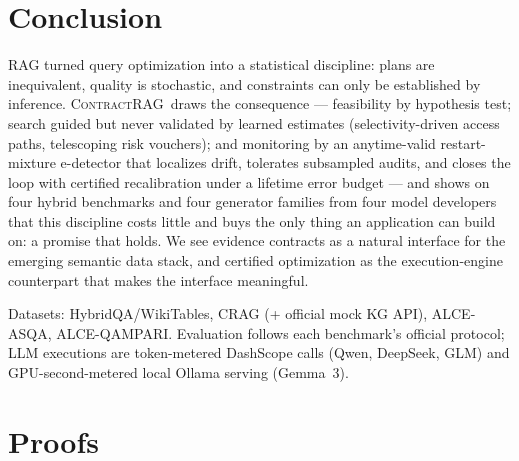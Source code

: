 \documentclass[sigconf,nonacm]{acmart}
\newcommand{\system}{\textsc{ContractRAG}\xspace}
\begin{document}
\maketitle









\section{Conclusion}
\label{sec:conclusion}
RAG turned query optimization into a statistical discipline: plans are
inequivalent, quality is stochastic, and constraints can only be
established by inference. \system\ draws the consequence --- feasibility
by hypothesis test; search guided but never validated by learned
estimates (selectivity-driven access paths, telescoping risk vouchers);
and monitoring by an anytime-valid restart-mixture e-detector that
localizes drift, tolerates subsampled audits, and closes the loop with
certified recalibration under a lifetime error budget ---
and shows on four hybrid benchmarks and four generator families from
four model developers that this discipline costs little and buys the
only thing an application can build on: a promise that holds. We see
evidence contracts as a natural interface for the emerging semantic data
stack, and certified optimization as the execution-engine counterpart that
makes the interface meaningful.

\begin{acks}
Datasets: HybridQA/WikiTables, CRAG (+ official mock KG API), ALCE-ASQA,
ALCE-QAMPARI. Evaluation follows each benchmark's official protocol; LLM
executions are token-metered DashScope calls (Qwen, DeepSeek, GLM) and
GPU-second-metered local Ollama serving (Gemma~3).
\end{acks}




\appendix

\section{Proofs}
\label{app:proofs}
\end{document}
